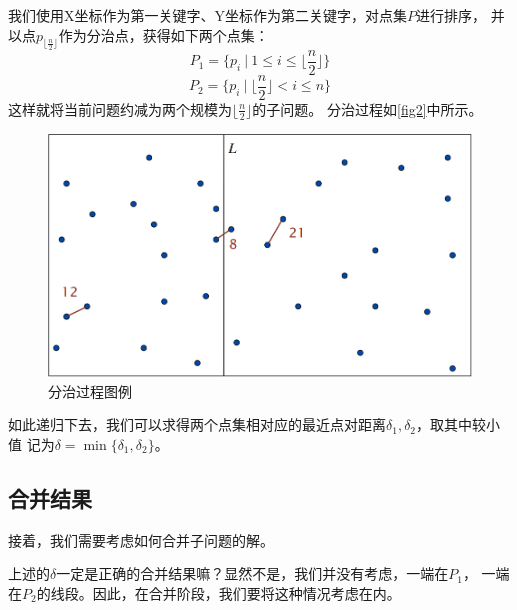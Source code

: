 我们使用X坐标作为第一关键字、Y坐标作为第二关键字，对点集$P$进行排序，
并以点$p_{\lfloor\frac{n}{2}\rfloor}$作为分治点，获得如下两个点集：
\begin{equation*}
    P_1 = \{p_i\ \big|\ 1 \le i \le \lfloor\frac{n}{2}\rfloor \}
\end{equation*}
\begin{equation*}
    P_2 = \{p_i\ \big|\ \lfloor\frac{n}{2}\rfloor < i \le n\}
\end{equation*}
这样就将当前问题约减为两个规模为$\lfloor\frac{n}{2}\rfloor$的子问题。
分治过程如\autoref{fig2}中所示。

\begin{figure}[htb]
    \centering
    \includegraphics[scale=0.5]{Ln9.image/NearestPointsDivide.png}
    \caption{分治过程图例}\label{fig2}
\end{figure}

如此递归下去，我们可以求得两个点集相对应的最近点对距离$\delta_1, \delta_2$，取其中较小值
记为$\delta = \min \{ \delta_1 , \delta_2 \}$。


\subsection{合并结果}

接着，我们需要考虑如何合并子问题的解。

上述的$\delta$一定是正确的合并结果嘛？显然不是，我们并没有考虑，一端在$P_1$，
一端在$P_2$的线段。因此，在合并阶段，我们要将这种情况考虑在内。

